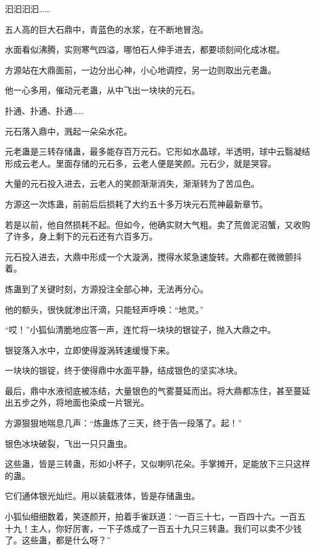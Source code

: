 
\begin{this_body}

汩汩汩汩……

五人高的巨大石鼎中，青蓝色的水浆，在不断地冒泡。

水面看似沸腾，实则寒气四溢，哪怕石人伸手进去，都要顷刻间化成冰棍。

方源站在大鼎面前，一边分出心神，小心地调控，另一边则取出元老蛊。

他一心多用，催动元老蛊，从中飞出一块块的元石。

扑通、扑通、扑通……

元石落入鼎中，溅起一朵朵水花。

元老蛊是三转存储蛊，最多能存百万元石。它形如水晶球，半透明，球中云翳凝结形成云老人。里面存储的元石多，云老人便是笑颜。元石少，就是哭容。

大量的元石投入进去，云老人的笑颜渐渐消失，渐渐转为了苦瓜色。

方源这一次炼蛊，前前后后损耗了大约五十多万块元石荒神最新章节。

若是以前，他自然损耗不起。但如今，他确实财大气粗。卖了荒兽泥沼蟹，又收购了许多，身上剩下的元石还有六百多万。

元石投入进去，大鼎中形成一个大漩涡，搅得水浆急速旋转。大鼎都在微微颤抖着。

炼蛊到了关键时刻，方源投注全部心神，无法再分心。

他的额头，很快就渗出汗滴，只能轻声呼唤：“地灵。”

“哎！”小狐仙清脆地应答一声，连忙将一块块的银锭子，抛入大鼎之中。

银锭落入水中，立即使得漩涡转速缓慢下来。

一块块的银锭，终于使得鼎中水面平静，结成银色的坚实冰块。

最后，鼎中水液彻底被冻结，大量银色的气雾蔓延而出。将大鼎都冻住，甚至蔓延出五步之外，将地面也染成一片银光。

方源狠狠地喘息几声：“炼蛊炼了三天，终于告一段落了。起！”

银色冰块破裂，飞出一只只蛊虫。

这些蛊，皆是三转蛊，形如小杯子，又似喇叭花朵。手掌摊开，足能放下三只这样的蛊。

它们通体银光灿烂。用以装载液体，皆是存储蛊虫。

小狐仙细细数着，笑逐颜开，拍着手雀跃道：“一百三十七，一百四十六。一百五十九！主人，你好厉害，一下子炼成了一百五十九只三转蛊。我们可以卖不少钱了。这些蛊，都是什么呀？”


\end{this_body}
